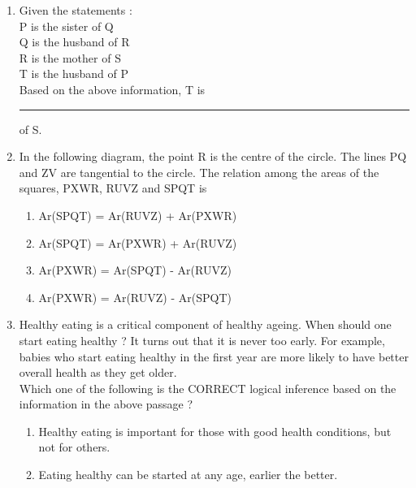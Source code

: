 \documentclass[journal]{IEEEtran}
\begin{document}
\begin{enumerate}
\begin{enumerate}
\begin{multicols}{4}
						\end{multicols}
				\end{enumerate}
	\item Given the statements : \\
		P is the sister of Q \\
		Q is the husband of R \\
		R is the mother of S \\
		T is the husband of P \\
		Based on the above information, T is \rule{1cm}{0.1pt} of S.
		\begin{enumerate}
		\end{enumerate}
	\item In the following diagram, the point R is the centre of the circle. The lines PQ and ZV are tangential to the circle. The relation among the areas of the squares, PXWR, RUVZ and SPQT is
		\begin{figure}[H]
			\centering
			
			\label{tab: Q_5}
		\end{figure}
		\begin{enumerate}
			\item Ar(SPQT) = Ar(RUVZ) + Ar(PXWR)
			\item Ar(SPQT) = Ar(PXWR) + Ar(RUVZ)
			\item Ar(PXWR) = Ar(SPQT) - Ar(RUVZ)
			\item Ar(PXWR) = Ar(RUVZ) - Ar(SPQT)
		\end{enumerate}
	\item Healthy eating is a critical component of healthy ageing. When should one start eating healthy ? It turns out that it is never too early. For example, babies who start eating healthy in the first year are more likely to have better overall health as they get older. \\
		Which one of the following is the CORRECT logical inference based on the information in the above passage ?
		\begin{enumerate}
			\item Healthy eating is important for those with good health conditions, but not for others.
			\item Eating healthy can be started at any age, earlier the better.

\end{enumerate}
\end{enumerate}
\end{document}
